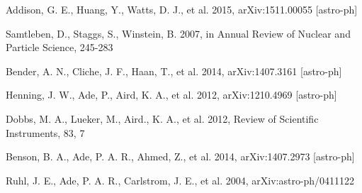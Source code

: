 \documentclass[iop]{emulateapj}
\begin{document}
%
\begin{thebibliography}{dummy}
Addison, G. E., Huang, Y., Watts, D. J., et al. 2015, {arXiv:1511.00055 [astro-ph]}

Samtleben, D., Staggs, S., Winstein, B. 2007, in Annual Review of Nuclear and Particle Science, 245-283

Bender, A. N., Cliche, J. F., Haan, T., et al. 2014, {arXiv:1407.3161 [astro-ph]}

Henning, J. W., Ade, P., Aird, K. A., et al. 2012, {arXiv:1210.4969 [astro-ph]}

Dobbs, M. A., Lueker, M., Aird., K. A., et al. 2012, Review of Scientific Instruments, 83, 7

Benson, B. A., Ade, P. A. R., Ahmed, Z., et al. 2014, {arXiv:1407.2973 [astro-ph]}

Ruhl, J. E., Ade, P. A. R., Carlstrom, J. E., et al. 2004, {arXiv:astro-ph/0411122}

\end{thebibliography}
\end{document}
